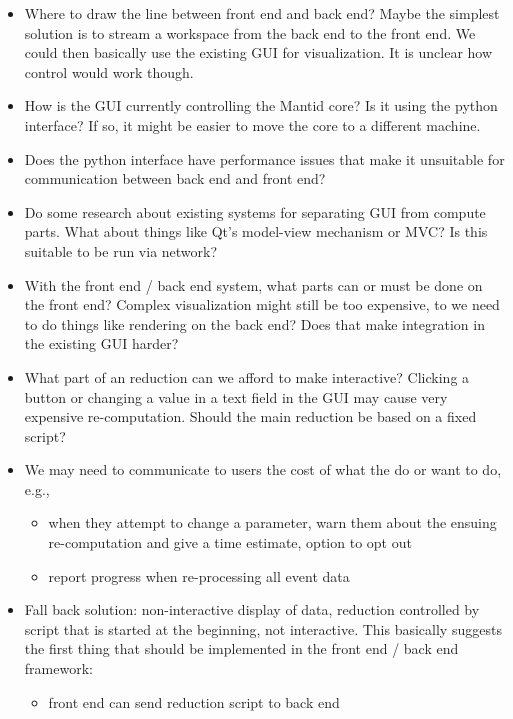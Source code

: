 \documentclass[a4paper,english,numbers=noenddot,bibliography=totoc,chapterprefix=on,DIV=12]{scrartcl}
\begin{document}
\begin{itemize}
    \item Where to draw the line between front end and back end?
        Maybe the simplest solution is to stream a workspace from the back end to the front end.
        We could then basically use the existing GUI for visualization.
        It is unclear how control would work though.
    \item How is the GUI currently controlling the Mantid core?
        Is it using the python interface?
        If so, it might be easier to move the core to a different machine.
    \item Does the python interface have performance issues that make it unsuitable for communication between back end and front end?
    \item Do some research about existing systems for separating GUI from compute parts.
        What about things like Qt's model-view mechanism or MVC?
        Is this suitable to be run via network?
    \item With the front end / back end system, what parts can or must be done on the front end?
        Complex visualization might still be too expensive, to we need to do things like rendering on the back end?
        Does that make integration in the existing GUI harder?
    \item What part of an reduction can we afford to make interactive?
        Clicking a button or changing a value in a text field in the GUI may cause very expensive re-computation.
        Should the main reduction be based on a fixed script?
    \item We may need to communicate to users the cost of what the do or want to do, e.g.,
        \begin{itemize}
            \item when they attempt to change a parameter, warn them about the ensuing re-computation and give a time estimate, option to opt out
            \item report progress when re-processing all event data
        \end{itemize}
    \item Fall back solution: non-interactive display of data, reduction controlled by script that is started at the beginning, not interactive.
        This basically suggests the first thing that should be implemented in the front end / back end framework:
        \begin{itemize}
            \item front end can send reduction script to back end

\end{itemize}
\end{itemize}
\end{document}

